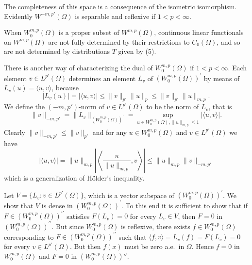The completeness of this space is a consequence of the isometric isomorphism. Evidently $W^{-m, p'}(\Omega)$ is separable and reflexive if $1<p<\infty$.

When $W_0^{m, p}(\Omega)$ is a proper subset of $W^{m,p}(\Omega)$, continuous linear functionals on $W^{m,p}(\Omega)$ are not fully determined by their restrictions to $C_0(\Omega)$, and so are not determined by distributions $T$ given by (5).


\begin{para}
  There is another way of characterizing the dual of $W_0^{m, p}(\Omega)$ if $1<p<\infty$.
  Each element $v \in L^{p'}(\Omega)$ determines an element $L_v$
  of $\left(W_0^{m, p}(\Omega)\right)^{\prime}$ by means of $L_v(u)=\langle u, v\rangle$,
  because
  \[
  \left|L_v(u)\right|=|\langle u, v\rangle| \leq\|v\|_{p'}\|u\|_p \leq\|v\|_{p'}\|u\|_{m,p} .
  \]
  We define the $\left(-m, p'\right)$-norm of $v \in L^{p'}(\Omega)$ to be the norm of $L_v$, that is
  \[
  \|v\|_{-m, p'}
    = \|L_v\|_{\left(W_0^{m, p}(\Omega)\right)^{\prime}}
    = \sup_{u \in W_0^{m, p}(\Omega),\|u\|_{m,p} \leq 1}|\langle u, v\rangle| .
  \]
  Clearly $\|v\|_{-m, p'} \leq\|v\|_{p'}$ and for any $u \in W_0^{m, p}(\Omega)$ and $v \in L^{p'}(\Omega)$ we have
  \begin{equation}\label{eq:3.6}
  |\langle u, v\rangle|=\|u\|_{m,p}\left|\left\langle\frac{u}{\|u\|_{m,p}}, v\right\rangle\right| \leq\|u\|_{m,p}\|v\|_{-m, p'}
  \end{equation}
  which is a generalization of Hölder's inequality.

  Let $V = \{L_v: v \in L^{p'}(\Omega)\}$, which is a vector subspace of
  $\left(W_0^{m, p}(\Omega)\right)^{\prime}$.
  We show that $V$ is dense in $\left(W_0^{m, p}(\Omega)\right)^{\prime}$.
  To this end it is sufficient to show that if
  $F \in\left(W_0^{m, p}(\Omega)\right)^{\prime \prime}$ satisfies $F\left(L_v\right)=0$
  for every $L_v \in V$, then $F=0$ in $\left(W_0^{m, p}(\Omega)\right)^{\prime \prime}$.
  But since $W_0^{m, p}(\Omega)$ is reflexive, there exists $f \in W_0^{m, p}(\Omega)$ corresponding to $F \in\left(W_0^{m, p}(\Omega)\right)^{\prime \prime}$
  such that $\langle f, v\rangle=L_v(f)=F\left(L_v\right)=0$ for every $v \in L^{p'}(\Omega)$.
  But then $f(x)$ must be zero a.e.~in $\Omega$. Hence $f=0$ in $W_0^{m, p}(\Omega)$ and 
  $F=0$ in $(W_0^{m, p}(\Omega))''$.
  

\end{para}

